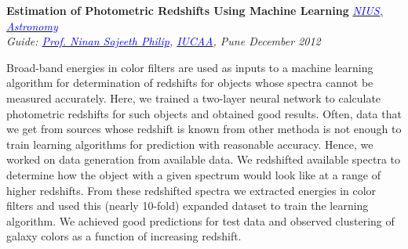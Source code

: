 \documentclass[margin,line]{res}
\newenvironment{list1}{
  \begin{list}{\ding{113}}{%
      \setlength{\itemsep}{0in}
      \setlength{\parsep}{0in} \setlength{\parskip}{0in}
      \setlength{\topsep}{0in} \setlength{\partopsep}{0in} 
      \setlength{\leftmargin}{0.17in}}}{\end{list}}
\begin{document}
\begin{resume}
{\bf Estimation of Photometric Redshifts Using Machine Learning} \hfill \textit{\href{http://nius.hbcse.tifr.res.in/}{\textcolor{blue} {NIUS, Astronomy}}} \\
{\em Guide: \href{http://www.iucaa.ernet.in/~nspp/}{\textcolor{blue}{Prof. Ninan Sajeeth Philip}}, \href{http://www.iucaa.ernet.in/}{\textcolor{blue} {IUCAA}}, Pune \hfill December 2012} \\
\vspace*{-.15in}
\begin{list1}
\item[] Broad-band energies in color filters are used as inputs to a machine learning algorithm for determination of redshifts for objects whose spectra cannot be measured accurately. Here, we trained a two-layer neural network to calculate photometric redshifts for such objects and obtained good results. Often, data that we get from sources whose redshift is known from other methoda is not enough to train learning algorithms for prediction with reasonable accuracy. Hence, we worked on data generation from available data. We redshifted available spectra to determine how the object with a given spectrum would look like at a range of higher redshifts. From these redshifted spectra we extracted energies in color filters and used this (nearly 10-fold) expanded dataset to train the learning algorithm. We achieved good predictions for test data and observed clustering of galaxy colors as a function of increasing redshift.
\end{list1}


\end{resume}
\end{document}
